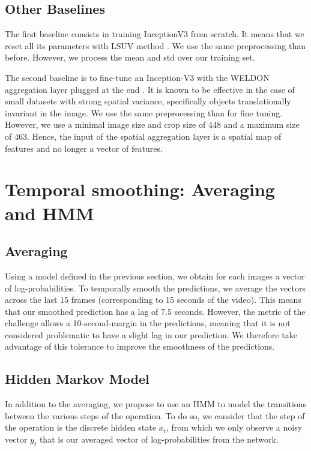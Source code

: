 \documentclass[10pt,twocolumn,letterpaper]{article}
\begin{document}
\subsection{Other Baselines}

The first baseline consists in training InceptionV3 from scratch. It means that we reset all its parameters with LSUV method \cite{LSUVInit2015}. We use the same preprocessing than before. However, we process the mean and std over our training set.

The second baseline is to fine-tune an Inception-V3 with the WELDON aggregation layer plugged at the end \cite{durand2016weldon}.
It is known to be effective in the case of small datasets with strong spatial variance, specifically objects translationally invariant in the image.
We use the same preprocessing than for fine tuning. However, we use a minimal image size and crop size of 448 and a maximum size of 463. Hence, the input of the spatial aggregation layer is a spatial map of features and no longer a vector of features.


\section{Temporal smoothing: Averaging and HMM}

\subsection{Averaging}

Using a model defined in the previous section, we obtain for each images a vector of log-probabilities.
To temporally smooth the predictions, we average the vectors across the
last 15 frames (corresponding to 15 seconds of the video). This means that our
smoothed prediction has a lag of 7.5 seconds. However, the metric of the challenge
allows a 10-second-margin in the predictions, meaning that it is not considered
problematic to have a slight lag in our prediction. We therefore take advantage
of this tolerance to improve the smoothness of the predictions.

\subsection{Hidden Markov Model}

In addition to the averaging, we propose to use an HMM to model the transitions
between the various steps of the operation. To do so, we consider that the step of the operation is the discrete hidden state $x_t$,
from which we only observe a noisy vector $y_t$ that is our averaged vector of log-probabilities from
the network.
\end{document}
